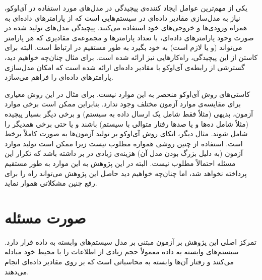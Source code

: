 یکی از مهم‌ترین عوامل ایجاد کننده‌ی پیچیدگی در مدل‌های مورد استفاده در آی‌اوکو، نیاز به مدل‌سازی مقادیر داده‌ای در سیستم‌هایی است که از پارامترهای داده‌ای به همراه ورودی‌‌ها و خروجی‌های خود استفاده می‌کنند. پیچیدگی مدل‌های تولید شده در صورت وجود پارامترهای داده‌ای، با تعداد پارامترها و مجموعه‌ی مقادیری که هر پارامتر می‌تواند (و یا لازم است) به خود بگیرد به طور مستقیم در ارتباط است. البته برای کاستن از این پیچیدگی، راه‌کارهایی نیز ارائه شده است. برای مثال چنان‌چه خواهیم دید، گسترشی از رابطه‌ی آی‌او‌کو با مقادیر داده‌ای ارائه شده است که امکان مدل‌سازی پارامترهای داده‌ای را فراهم می‌سازد. 

کاستی‌های روش آی‌‌اوکو منحصر به این موارد نیست. برای مثال در این روش معیاری برای مقایسه‌ی موارد آزمون مختلف وجود ندارد. بنابراین ممکن است برخی موارد آزمون، بدیهی (مثلاً فقط شامل یک ارسال داده به سیستم) و برخی دیگر بسیار پیچیده (مثلاً شامل ده‌ها و یا صدها رفتار متوالی با سیستم) باشند و یا حتی برخی همدیگر را شامل شوند. مثال دیگر، اتکای روش آی‌او‌کو بر تولید آزمون‌ها به صورت کاملاً برخط است. استفاده از چنین روشی همواره مطلوب نیست زیرا ممکن است تولید موارد آزمون (به دلیل بزرگ بودن مدل آن) هزینه‌ی زیادی در بر داشته باشد که تکرار این مسئله احتمالاً مطلوب نیست. البته در این پژوهش به این موارد به طور مستقیم پرداخته نخواهد شد، اما چنان‌چه خواهیم دید حاصل این پژوهش می‌تواند راه را برای رفع چنین مشکلاتی هموار نماید.

\section{صورت مسئله}
تمرکز اصلی این پژوهش بر آزمون مبتنی بر مدل سیستم‌های وابسته به داده قرار دارد. سیستم‌های وابسته به داده معمولاً حجم زیادی از اطلاعات را با محیط خود مبادله‌ می‌‌کنند و رفتار آن‌ها وابسته به محاسباتی است که بر روی مقادیر داده‌ای انجام می‌دهند. 


